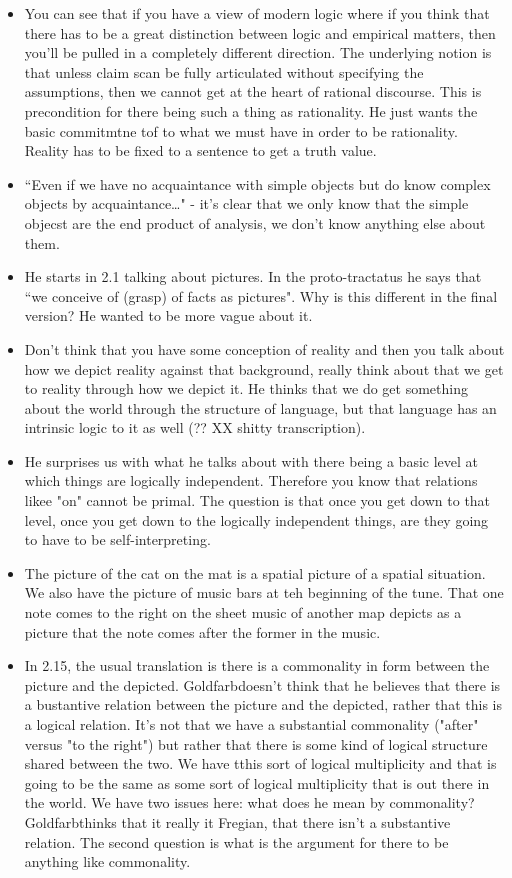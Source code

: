 \documentclass[12pt]{article}
\theoremstyle{definition}
\newcommand{\g}{Goldfarb}
\begin{document}
\begin{itemize}
    \item You can see that if you have a view of modern logic where if you think that there has to be a great distinction between logic and empirical matters, then you'll be pulled in a completely different direction. The underlying notion is that unless claim scan be fully articulated without specifying the assumptions, then we cannot get at the heart of rational discourse. This is precondition for there being such a thing as rationality. He just wants the basic commitmtne tof to what we must have in order to be rationality. Reality has to be fixed to a sentence to get a truth value. 
    \item ``Even if we have no acquaintance with simple objects but do know complex objects by acquaintance\ldots" - it's clear that we only know that the simple objecst are the end product of analysis, we don't know anything else about them. 
    \item He starts in 2.1 talking about pictures. In the proto-tractatus he says that ``we conceive of (grasp) of facts as pictures". Why is this different in the final version? He wanted to be more vague about it.
    \item Don't think that you have some conception of reality and then you talk about how we depict reality against that background, really think about that we get to reality through how we depict it. He thinks that we do get something about the world through the structure of language, but that language has an intrinsic logic to it as well (?? XX shitty transcription).
    \item He surprises us with what he talks about with there being a basic level at which things are logically independent. Therefore you know that relations likee "on" cannot be primal. The question is that once you get down to that level, once you get down to the logically independent things, are they going to have to be self-interpreting.
    \item The picture of the cat on the mat is a spatial picture of a spatial situation. We also have the picture of music bars at teh beginning of the tune. That one note comes to the right on the sheet music of another map depicts as a picture that the note comes after the former in the music.
    \item In 2.15, the usual translation is there is a commonality in form between the picture and the depicted. \g doesn't think that he believes that there is a bustantive relation between the picture and the depicted, rather that this is a logical relation. It's not that we have a substantial commonality ("after" versus "to the right") but rather that there is some kind of logical structure shared between the two. We have tthis sort of logical multiplicity and that is going to be the same as some sort of logical multiplicity that is out there in the world. We have two issues here: what does he mean by commonality? \g thinks that it really it Fregian, that there isn't a substantive relation. The second question is what is the argument for there to be anything like commonality. 

\end{itemize}
\end{document}
